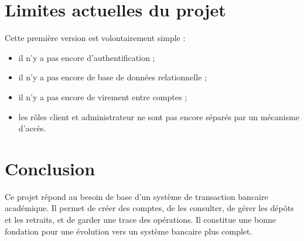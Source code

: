 \documentclass[12pt,a4paper]{article}
\begin{document}
\section{Limites actuelles du projet}

Cette première version est volontairement simple :

\begin{itemize}
    \item il n'y a pas encore d'authentification ;
    \item il n'y a pas encore de base de données relationnelle ;
    \item il n'y a pas encore de virement entre comptes ;
    \item les rôles client et administrateur ne sont pas encore séparés par un mécanisme d'accès.
\end{itemize}

\section{Conclusion}

Ce projet répond au besoin de base d'un système de transaction bancaire académique. Il permet de créer des comptes, de les consulter, de gérer les dépôts et les retraits, et de garder une trace des opérations. Il constitue une bonne fondation pour une évolution vers un système bancaire plus complet.
\end{document}
